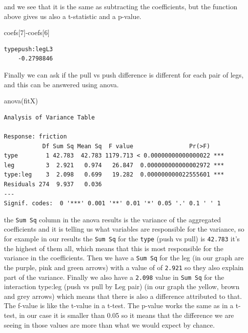 \documentclass[
  letterpaper,
  DIV=11,
  numbers=noendperiod]{scrartcl}
\newenvironment{Shaded}{\begin{snugshade}}{\end{snugshade}}
\newcommand{\DecValTok}[1]{\textcolor[rgb]{0.68,0.00,0.00}{#1}}
\newcommand{\FunctionTok}[1]{\textcolor[rgb]{0.28,0.35,0.67}{#1}}
\newcommand{\NormalTok}[1]{\textcolor[rgb]{0.00,0.23,0.31}{#1}}
\newcommand{\SpecialCharTok}[1]{\textcolor[rgb]{0.37,0.37,0.37}{#1}}
\begin{document}
and we see that it is the same as subtracting the coefficients, but the
function above gives us also a t-statistic and a p-value.

\begin{Shaded}
\begin{Highlighting}[]
\NormalTok{coefs[}\DecValTok{7}\NormalTok{]}\SpecialCharTok{{-}}\NormalTok{coefs[}\DecValTok{6}\NormalTok{]}
\end{Highlighting}
\end{Shaded}

\begin{verbatim}
typepush:legL3 
    -0.2798846 
\end{verbatim}

Finally we can ask if the pull vs push difference is different for each
pair of legs, and this can be answered using anova.

\begin{Shaded}
\begin{Highlighting}[]
\FunctionTok{anova}\NormalTok{(fitX)}
\end{Highlighting}
\end{Shaded}

\begin{verbatim}
Analysis of Variance Table

Response: friction
           Df Sum Sq Mean Sq  F value                Pr(>F)    
type        1 42.783  42.783 1179.713 < 0.00000000000000022 ***
leg         3  2.921   0.974   26.847  0.000000000000002972 ***
type:leg    3  2.098   0.699   19.282  0.000000000022555601 ***
Residuals 274  9.937   0.036                                   
---
Signif. codes:  0 '***' 0.001 '**' 0.01 '*' 0.05 '.' 0.1 ' ' 1
\end{verbatim}

the \texttt{Sum\ Sq} column in the anova results is the variance of the
aggregated coefficients and it is telling us what variables are
responsible for the variance, so for example in our results the
\texttt{Sum\ Sq} for the \texttt{type} (push vs pull) is \texttt{42.783}
it's the highest of them all, which means that this is most responsible
for the variance in the coefficients. Then we have a \texttt{Sum\ Sq}
for the leg (in our graph are the purple, pink and green arrows) with a
value of of \texttt{2.921} so they also explain part of the variance.
Finally we also have a \texttt{2.098} value in \texttt{Sum\ Sq} for the
interaction type:leg (push vs pull by Leg pair) (in our graph the
yellow, brown and grey arrows) which means that there is also a
difference attributed to that. The f-value is like the t-value in a
t-test. The p-value works the same as in a t-test, in our case it is
smaller than 0.05 so it means that the difference we are seeing in those
values are more than what we would expect by chance.
\end{document}
